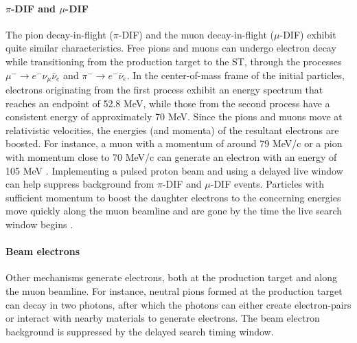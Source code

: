 \paragraph{$\pi$-DIF and $\mu$-DIF}
The pion decay-in-flight ($\pi$-DIF) and the muon decay-in-flight ($\mu$-DIF) 
exhibit quite similar characteristics. Free pions and muons can 
undergo electron decay while transitioning from the 
production target to the ST, through the processes 
$\mu^- \rightarrow e^- \nu_\mu \bar{\nu}_e$ and 
$\pi^- \rightarrow e^- \bar{\nu}_e$. In the center-of-mass 
frame of the initial particles, electrons originating 
from the first process exhibit an energy spectrum that 
reaches an endpoint of 52.8 MeV, while those from the 
second process have a consistent energy of approximately 
70 MeV. Since the pions and muons move at relativistic velocities, 
the energies (and momenta) of the resultant electrons are 
boosted. For instance, a muon with a momentum of around 
79 MeV/c or a pion with momentum close to 70 MeV/c can generate 
an electron with an energy of 105 MeV \cite{bartoszek2015mu2e}. 
Implementing a pulsed proton beam and using a delayed 
live window can help suppress background from $\pi$-DIF and 
$\mu$-DIF events. Particles with sufficient momentum 
to boost the daughter electrons to the concerning energies 
move quickly along the muon beamline and are gone by the 
time the live search window begins \cite{bobbb}. 


\paragraph{Beam electrons}\label{beamelectrons}
Other mechanisms generate electrons, both at the production target 
and along the muon beamline. For instance, neutral pions formed at 
the production target can decay in two photons, after which the 
photons can either create electron-pairs or interact with nearby 
materials to generate electrons. 
The beam electron background is suppressed by the delayed search timing window.


